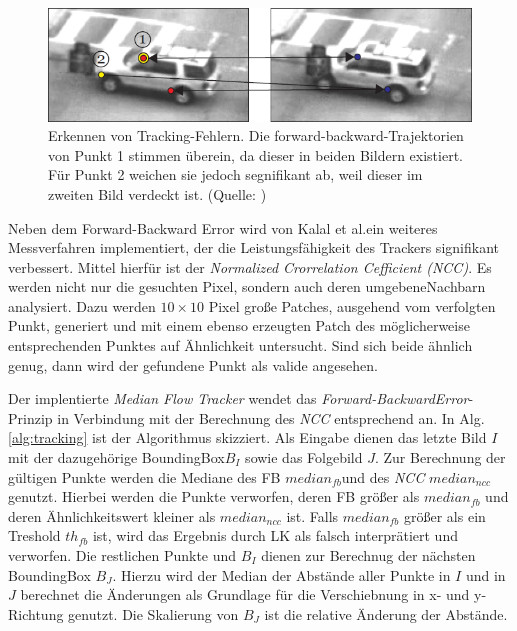 	\begin{figure}
	\begin{centering}
	\includegraphics[scale=0.7]{../pictures/MediaFlow.png}
	\par\end{centering}

	\caption[Erkennen von Tracking-Fehlern]{Erkennen von Tracking-Fehlern. Die forward-backward-Trajektorien von Punkt 1 stimmen überein, da dieser in beiden Bildern existiert. Für Punkt 2 weichen sie jedoch segnifikant ab, weil dieser im zweiten Bild verdeckt ist. (Quelle: \cite{MFT})\label{fig:Prinzip-des-Media}}
	\end{figure}

	Neben dem Forward-Backward Error wird von Kalal et al.\cite{TLD}ein weiteres Messverfahren implementiert, der die Leistungsfähigkeit des Trackers signifikant verbessert\cite{MFT}. Mittel hierfür ist der \textit{Normalized Crorrelation Cefficient (NCC)}. %
	Es werden nicht nur die gesuchten Pixel, sondern auch deren umgebeneNachbarn analysiert. Dazu werden $10\times10$ Pixel große Patches, ausgehend vom verfolgten Punkt, generiert und mit einem ebenso erzeugten Patch des möglicherweise entsprechenden Punktes auf Ähnlichkeit untersucht. Sind sich beide ähnlich genug, dann wird der gefundene Punkt als valide angesehen.

	Der implentierte \textit{Median Flow Tracker} wendet das \textit{Forward-BackwardError}-Prinzip in Verbindung mit der Berechnung des \textit{NCC} entsprechend \cite{key-5} an. In Alg.\ref{alg:tracking} ist der Algorithmus skizziert. Als Eingabe dienen das letzte Bild $I$ mit der dazugehörige BoundingBox$B_{I}$ sowie das Folgebild $J$. Zur Berechnung der gültigen Punkte werden die Mediane des FB $median_{fb}$und des \textit{NCC} $median_{ncc}$genutzt. Hierbei werden die Punkte verworfen, deren FB größer als $median_{fb}$ und deren Ähnlichkeitswert kleiner als $median_{ncc}$ ist. Falls $median_{fb}$ größer als ein Treshold $th_{fb}$ ist, wird das Ergebnis durch LK als falsch interprätiert und verworfen. Die restlichen Punkte und $B_{I}$ dienen zur Berechnug der nächsten BoundingBox $B_{J}$. Hierzu wird der Median der Abstände aller Punkte in $I$ und in $J$ berechnet die Änderungen als Grundlage für die Verschiebnung in x- und y-Richtung genutzt. Die Skalierung von $B_{J}$ ist die relative
	Änderung der Abstände.

